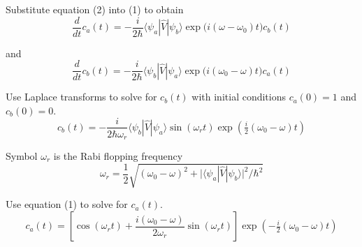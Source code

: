 Substitute equation (2) into (1) to obtain
\begin{equation*}
\frac{d}{dt}c_a(t)=-\frac{i}{2\hbar}\langle\psi_a|\hat V|\psi_b\rangle
\exp\bigl(i(\omega-\omega_0)t\bigr)c_b(t)
\tag{3}
\end{equation*}

and
\begin{equation*}
\frac{d}{dt}c_b(t)=-\frac{i}{2\hbar}\langle\psi_b|\hat V|\psi_a\rangle
\exp\bigl(i(\omega_0-\omega)t\bigr)c_a(t)
\tag{4}
\end{equation*}

Use Laplace transforms to solve for $c_b(t)$ with initial conditions $c_a(0)=1$ and $c_b(0)=0$.
\begin{equation*}
c_b(t)=-\frac{i}{2\hbar\omega_r}\langle\psi_b|\hat V|\psi_a\rangle
\sin(\omega_rt)\exp\left(\tfrac{i}{2}(\omega_0-\omega)t\right)
\end{equation*}

Symbol $\omega_r$ is the Rabi flopping frequency
\begin{equation*}
\omega_r=\frac{1}{2}\sqrt{(\omega_0-\omega)^2
+\bigl|\langle\psi_a|\hat V|\psi_b\rangle\bigr|^2/\hbar^2}
\end{equation*}

Use equation (1) to solve for $c_a(t)$.
\begin{equation*}
c_a(t)=\left[\cos(\omega_rt)+\frac{i(\omega_0-\omega)}{2\omega_r}\sin(\omega_rt)\right]
\exp\left(-\tfrac{i}{2}(\omega_0-\omega)t\right)
\end{equation*}


